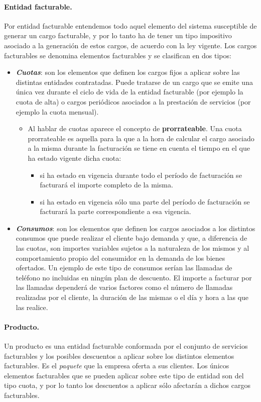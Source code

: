 \paragraph{Entidad facturable.} Por entidad facturable entendemos todo aquel elemento del sistema susceptible de generar un cargo facturable, y por lo tanto ha de tener un tipo impositivo asociado a la generación de estos cargos, de acuerdo con la ley vigente. Los cargos facturables se denomina elementos facturables y se clasifican en dos tipos:
\begin{itemize}
	\item \emph{\textbf{Cuotas}}: son los elementos que definen los cargos fijos a aplicar sobre las distintas entidades contratadas. Puede tratarse de un cargo que se emite una única vez durante el ciclo de vida de la entidad facturable (por ejemplo la cuota de alta) o cargos periódicos asociados a la prestación de servicios (por ejemplo la cuota mensual).
	\begin{itemize}
		\item Al hablar de cuotas aparece el concepto de \textbf{prorrateable}. Una cuota prorrateable es aquella para la que a la hora de calcular el cargo asociado a la misma durante la facturación se tiene en cuenta el tiempo en el que ha estado vigente dicha cuota: 
		\begin{itemize}
			\item si ha estado en vigencia durante todo el período de facturación se 		facturará el importe completo de la misma.
			\item si ha estado en vigencia sólo una parte del período de facturación se facturará la parte correspondiente a esa vigencia. 
		\end{itemize}
	\end{itemize}
	\item \emph{\textbf{Consumos}}: son los elementos que definen los cargos asociados a los distintos consumos que puede realizar el cliente bajo demanda y que, a diferencia de las cuotas, son importes variables sujetos a la naturaleza de los mismos y al comportamiento propio del consumidor en la demanda de los bienes ofertados. Un ejemplo de este tipo de consumos serían las llamadas de teléfono no incluidas en ningún plan de descuento. El importe a facturar por las llamadas dependerá de varios factores como el número de llamadas realizadas por el cliente, la duración de las mismas o el día y hora a las que las realice.
\end{itemize}


\paragraph{Producto.} Un producto es una entidad facturable conformada por el conjunto de servicios facturables y los posibles descuentos a aplicar sobre los distintos elementos facturables. Es el \textit{paquete} que la empresa oferta a sus clientes. Los únicos elementos facturables que se pueden aplicar sobre este tipo de entidad son del tipo cuota, y por lo tanto los descuentos a aplicar sólo afectarán a dichos cargos facturables.

